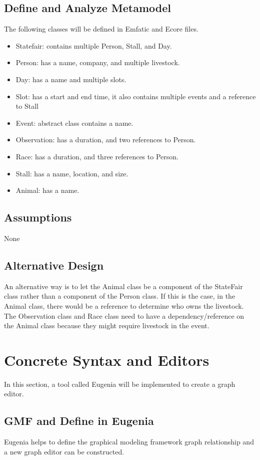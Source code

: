 \documentclass[12pt]{article}
\begin{document}
\subsection{Define and Analyze Metamodel}
The following classes will be defined in Emfatic and Ecore files.
\begin{itemize}
    \item Statefair: contains multiple Person, Stall, and Day.
    \item Person: has a name, company, and multiple livestock.
    \item Day: has a name and multiple slots.
    \item Slot: has a start and end time, it also contains multiple events and a reference to Stall 
    \item Event: abstract class contains a name.
    \item Observation: has a duration, and two references to Person.
    \item Race: has a duration, and three references to Person.
    \item Stall: has a name, location, and size.
    \item Animal: has a name.
\end{itemize}

\subsection{Assumptions}
None

\subsection{Alternative Design}
An alternative way is to let the Animal class be a component of the StateFair class rather 
than a component of the Person class. 
If this is the case, in the Animal class, there would be a reference to determine who owns the livestock. 
The Observation class and Race class need to have a dependency/reference on the Animal class 
because they might require livestock in the event.

\pagebreak
\section{Concrete Syntax and Editors}
In this section, a tool called Eugenia will be implemented to create a graph editor.

\subsection{GMF and Define in Eugenia}
Eugenia helps to define the graphical modeling framework graph relationship and a new 
graph editor can be constructed.
\end{document}
